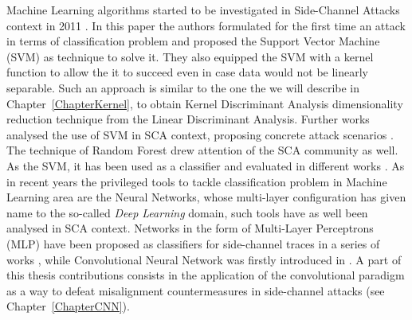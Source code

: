 Machine Learning algorithms started to be investigated in Side-Channel Attacks context in 2011 \cite{machineLearningSCA}. In this paper the authors formulated for the first time an attack in terms of classification problem and proposed the Support Vector Machine (SVM) \cite{cortes1995support,weston1998multi} as technique to solve it. They also equipped the SVM with a kernel function to allow the it to succeed even in case data would not be linearly separable. Such an approach is similar to the one the we will describe in Chapter~\ref{ChapterKernel}, to obtain Kernel Discriminant Analysis dimensionality reduction technique from the Linear Discriminant Analysis. Further works analysed the use of SVM in SCA context, proposing concrete attack scenarios \cite{intelligentMachineOmicide,effTA_SVM}. 
The technique of Random Forest \cite{lior2014data} drew attention of the SCA community as well. As the SVM, it has been used as a classifier and evaluated in different works \cite{lerman2015machine,lerman2015template,lerman2014power}. As in recent years the privileged tools to tackle classification problem in Machine Learning area are the Neural Networks, whose multi-layer configuration has given name to the so-called \emph{Deep Learning} domain, such tools have as well been analysed in SCA context. Networks in the form of Multi-Layer Perceptrons (MLP) have been proposed as classifiers for side-channel traces in a series of works \cite{martinasek2013optimization,martinasek2013innovative,martinasek2015profiling,martinasek2016profiling}, while Convolutional Neural Network was firstly introduced in \cite{maghrebi2016breaking}. A part of this thesis contributions consists in the application of the convolutional paradigm as a way to defeat misalignment countermeasures in side-channel attacks (see Chapter~\ref{ChapterCNN}).


